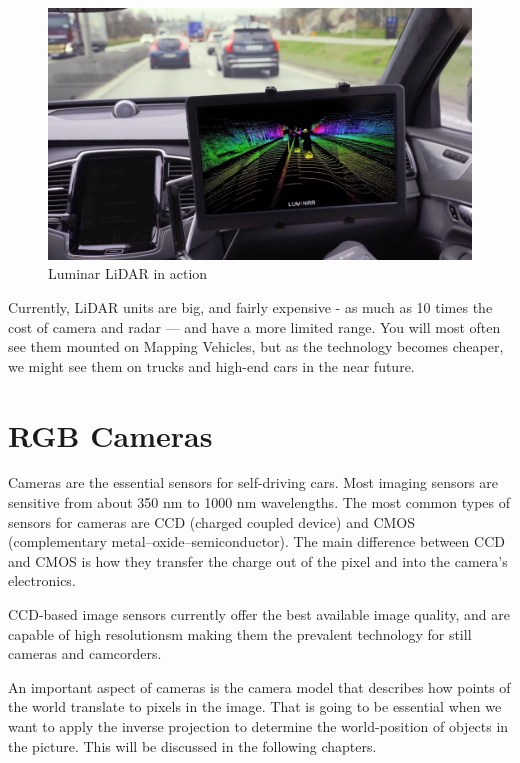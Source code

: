 \begin{figure}[!ht]
    \centering
    \includegraphics[width=150mm, keepaspectratio]{figures/luminar.png}
    \caption{Luminar LiDAR in action}
    \label{fig:luminar}
\end{figure}


Currently, LiDAR units are big, and fairly expensive - as much as 10 times
the cost of camera and radar — and have a more limited range. You will most
often see them mounted on Mapping Vehicles, but as the technology becomes
cheaper, we might see them on trucks and high-end cars in the near future.

\section{RGB Cameras}

Cameras are the essential sensors for self-driving cars. Most imaging sensors
are sensitive from about 350 nm to 1000 nm wavelengths. The most common types of
sensors for cameras are CCD (charged coupled device) and CMOS (complementary
metal–oxide–semiconductor). The main difference between CCD and CMOS is how they
transfer the charge out of the pixel and into the camera’s electronics.

CCD-based image sensors currently offer the best available image quality, and
are capable of high resolutionsm making them the prevalent technology for still
cameras and camcorders.

An important aspect of cameras is the camera model that describes how points of
the world translate to pixels in the image. That is going to be essential when
we want to apply the inverse projection to determine the world-position of
objects in the picture. This will be discussed in the following chapters. 


